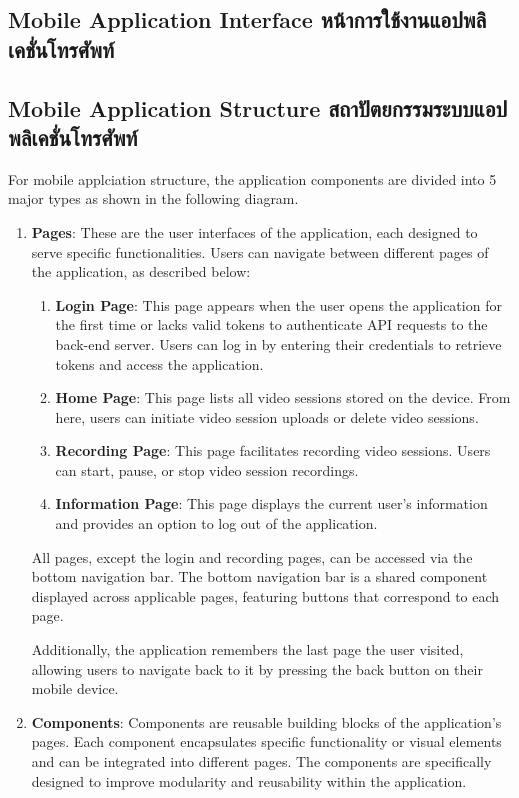 \subsection{\ifenglish Mobile Application Interface \else หน้าการใช้งานแอปพลิเคชั่นโทรศัพท์ \fi}

\subsection{\ifenglish Mobile Application Structure \else สถาปัตยกรรมระบบแอปพลิเคชั่นโทรศัพท์ \fi}
For mobile applciation structure, the application components are divided into 5 major types as shown in the following diagram.
\begin{enumerate}
    \item \textbf{Pages}: These are the user interfaces of the application, each designed to serve specific functionalities. Users can navigate between different pages of the application, as described below:  
    \begin{enumerate}  
        \item \textbf{Login Page}: This page appears when the user opens the application for the first time or lacks valid tokens to authenticate API requests to the back-end server. Users can log in by entering their credentials to retrieve tokens and access the application.  
        \item \textbf{Home Page}: This page lists all video sessions stored on the device. From here, users can initiate video session uploads or delete video sessions.  
        \item \textbf{Recording Page}: This page facilitates recording video sessions. Users can start, pause, or stop video session recordings.  
        \item \textbf{Information Page}: This page displays the current user's information and provides an option to log out of the application.  
    \end{enumerate}  
    All pages, except the login and recording pages, can be accessed via the bottom navigation bar. The bottom navigation bar is a shared component displayed across applicable pages, featuring buttons that correspond to each page.  
    
    Additionally, the application remembers the last page the user visited, allowing users to navigate back to it by pressing the back button on their mobile device.      

    \item \textbf{Components}: Components are reusable building blocks of the application's pages. Each component encapsulates specific functionality or visual elements and can be integrated into different pages. The components are specifically designed to improve modularity and reusability within the application.
    

\end{enumerate}
